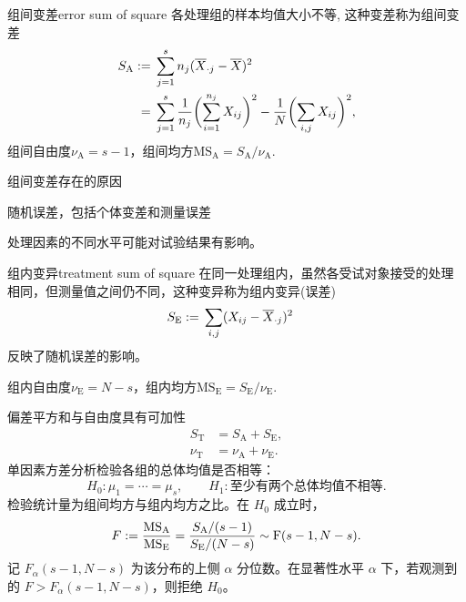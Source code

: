 \begin{definition}{组间变差}{error sum of square}
	各处理组的样本均值大小不等, 这种变差称为组间变差%
	\begin{subequations}
		\begin{align}
			S_{\mathrm A} := {}&\sum_{j=1}^sn_j(\overline{X}_{\cdot j} - \overline{X})^2\\\notag
			= {}&\sum_{j=1}^s\frac1{n_j}\biggl(\sum_{i=1}^{n_j}X_{ij}\biggr)^2 - \frac1N\biggl(\sum_{i,j}X_{ij}\biggr)^2,
		\end{align}
	\end{subequations}
	组间自由度$\nu_{\mathrm A} = s - 1$，组间均方$\mathrm{MS}_{\mathrm A} = S_{\mathrm A}/\nu_{\mathrm A}.$
\end{definition}
组间变差存在的原因
\begin{compactitem}
	\item 随机误差，包括个体变差和测量误差
	\item 处理因素的不同水平可能对试验结果有影响。
\end{compactitem}
\begin{definition}{组内变异}{treatment sum of square}
	在同一处理组内，虽然各受试对象接受的处理相同，但测量值之间仍不同，这种变异称为组内变异(误差)
	\begin{align}
		S_{\mathrm E} := {}&\sum_{i,j}(X_{ij} - \avg X_{\cdot j})^2%
	\end{align}
	反映了随机误差的影响。

	组内自由度$\nu_{\mathrm E} = N - s$，组内均方$\mathrm{MS}_{\mathrm E} = S_{\mathrm E}/\nu_{\mathrm E}.$
\end{definition}
偏差平方和与自由度具有可加性
\begin{subequations}
	\label{eq:ps-anova-decomposition}
	\begin{align}
		S_{\mathrm T} &= S_{\mathrm A} + S_{\mathrm E},\\
		\nu_{\mathrm T} &= \nu_{\mathrm A} + \nu_{\mathrm E}.
	\end{align}
\end{subequations}
单因素方差分析检验各组的总体均值是否相等：
\[
	H_0:\mu_1 = \cdots = \mu_s,\qquad
	H_1:\text{至少有两个总体均值不相等}.
\]
检验统计量为组间均方与组内均方之比。在 $H_0$ 成立时，
\begin{equation}
	F := \frac{\mathrm{MS}_{\mathrm A}}{\mathrm{MS}_{\mathrm E}}
	= \frac{S_{\mathrm A}/(s - 1)}{S_{\mathrm E}/(N - s)}
	\sim \operatorname{F}(s - 1,N - s).
\end{equation}
记 $F_\alpha(s - 1,N - s)$ 为该分布的上侧 $\alpha$ 分位数。在显著性水平 $\alpha$ 下，若观测到的 $F > F_\alpha(s - 1,N - s)$，则拒绝 $H_0$。
